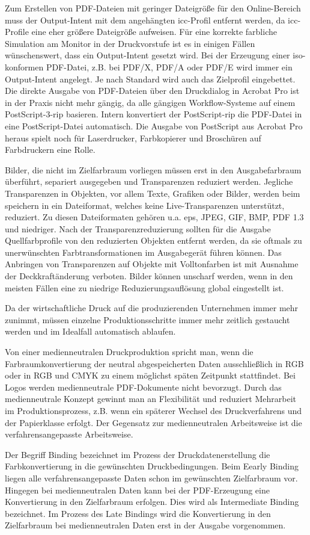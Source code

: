 Zum Erstellen von PDF-Dateien mit geringer Dateigröße für den Online-Bereich muss der Output-Intent mit dem angehängten \gls{icc}-Profil entfernt werden, da \gls{icc}-Profile eine eher größere Dateigröße aufweisen. Für eine korrekte farbliche Simulation am Monitor in der Druckvorstufe ist es in einigen Fällen wünschenswert, dass ein Output-Intent gesetzt wird. Bei der Erzeugung einer \gls{iso}-konformen PDF-Datei, z.B. bei PDF/X, PDF/A oder PDF/E wird immer ein Output-Intent angelegt. Je nach Standard wird auch das Zielprofil eingebettet. Die direkte Ausgabe von PDF-Dateien über den Druckdialog in Acrobat Pro ist in der Praxis nicht mehr gängig, da alle gängigen Workflow-Systeme auf einem PostScript-3-\gls{rip} basieren. Intern konvertiert der PostScript-\gls{rip} die PDF-Datei in eine PostScript-Datei automatisch. Die Ausgabe von PostScript aus Acrobat Pro heraus spielt noch für Laserdrucker, Farbkopierer und Broschüren auf Farbdruckern eine Rolle.
\cite{schneeberger}

Bilder, die nicht im Zielfarbraum vorliegen müssen erst in den Ausgabefarbraum überführt, separiert ausgegeben und Transparenzen reduziert werden. Jegliche Transparenzen in Objekten, vor allem Texte, Grafiken oder Bilder, werden beim speichern in ein Dateiformat, welches keine Live-Transparenzen unterstützt, reduziert. Zu diesen Dateiformaten gehören u.a. \gls{eps}, JPEG, GIF, BMP, PDF 1.3 und niedriger. Nach der Transparenzreduzierung sollten für die Ausgabe Quellfarbprofile von den reduzierten Objekten entfernt werden, da sie oftmals zu unerwünschten Farbtransformationen im Ausgabegerät führen können. Das Anbringen von Transparenzen auf Objekte mit Volltonfarben ist mit Ausnahme der Deckkraftänderung verboten. Bilder können unscharf werden, wenn in den meisten Fällen eine zu niedrige Reduzierungsauflösung global eingestellt ist.
\cite{schneeberger}

Da der wirtschaftliche Druck auf die produzierenden Unternehmen immer mehr zunimmt, müssen einzelne Produktionsschritte immer mehr zeitlich gestaucht werden und im Idealfall automatisch ablaufen. 

Von einer medienneutralen Druckproduktion spricht man, wenn die Farbraumkonvertierung der neutral abgespeicherten Daten ausschließlich in RGB oder in RGB und CMYK zu einem möglichst späten Zeitpunkt stattfindet. Bei Logos werden medienneutrale PDF-Dokumente nicht bevorzugt. Durch das medienneutrale Konzept gewinnt man an Flexibilität und reduziert Mehrarbeit im Produktionsprozess, z.B. wenn ein späterer Wechsel des Druckverfahrens und der Papierklasse erfolgt. Der Gegensatz zur medienneutralen Arbeitsweise ist die verfahrensangepasste Arbeitsweise.
\cite{schneeberger}

Der Begriff Binding bezeichnet im Prozess der Druckdatenerstellung die Farbkonvertierung in die gewünschten Druckbedingungen. Beim Eearly Binding liegen alle verfahrensangepasste Daten schon im gewünschten Zielfarbraum vor. Hingegen bei medienneutralen Daten kann bei der PDF-Erzeugung eine Konvertierung in den Zielfarbraum erfolgen. Dies wird als Intermediate Binding bezeichnet. Im Prozess des Late Bindings wird die Konvertierung in den Zielfarbraum bei medienneutralen Daten erst in der Ausgabe vorgenommen. 
\cite{schneeberger}